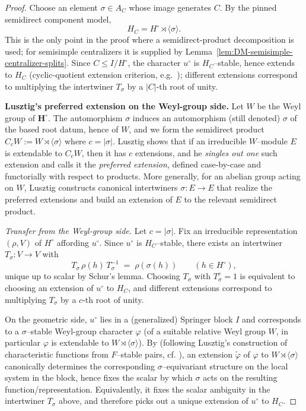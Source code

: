 \documentclass{amsart}
\theoremstyle{plain}
\numberwithin{equation}{section}
\theoremstyle{definition}
\begin{document}
\begin{proof}
Choose an element $\sigma\in A_C$ whose image generates $C$.  By the pinned
semidirect component model,
\[
        H_C=H^\circ\rtimes\langle\sigma\rangle .
\]
This is the only point in the proof where a semidirect-product decomposition is
used; for semisimple centralizers it is supplied by
Lemma~\ref{lem:DM-semisimple-centralizer-splits}.  Since $C\le I/H^\circ$, the
character $u^\circ$ is $H_C$--stable, hence extends to $H_C$ (cyclic-quotient
extension criterion, e.g.\ \cite[Cor.\ 11.22]{Isaacs}); different extensions correspond to multiplying the
intertwiner $T_\sigma$ by a $|C|$-th root of unity.

\textbf{Lusztig's preferred extension on the Weyl-group side.}
Let $W$ be the Weyl group of $\mathbf H^\circ$.
The automorphism $\sigma$ induces an automorphism (still denoted) $\sigma$ of the based root datum,
hence of $W$, and we form the semidirect product $C_cW:=W\rtimes\langle\sigma\rangle$ where
$c=|\sigma|$.
Lusztig shows that if an irreducible $W$--module $E$ is extendable to $C_cW$, then it has $c$
extensions, and he \emph{singles out one} such extension and calls it the \emph{preferred extension},
defined case-by-case and functorially with respect to products.  \cite[\S17.2]{Lusztig1986character}
More generally, for an abelian group acting on $W$, Lusztig constructs canonical intertwiners
$\sigma:E\to E$ that realize the preferred extensions and build an extension of $E$ to the relevant
semidirect product. \cite[\S17.3]{Lusztig1986character}

\smallskip\noindent
\emph{Transfer from the Weyl-group side.}
Let $c=|\sigma|$.
Fix an irreducible representation $(\rho,V)$ of $H^\circ$ affording $u^\circ$.
Since $u^\circ$ is $H_C$--stable, there exists an intertwiner
$T_\sigma:V\to V$ with
\[
T_\sigma\,\rho(h)\,T_\sigma^{-1} \;=\; \rho(\sigma(h))
\qquad(h\in H^\circ),
\]
unique up to scalar by Schur's lemma. Choosing $T_\sigma$ with $T_\sigma^c=1$
is equivalent to choosing an extension of $u^\circ$ to $H_C$, and different
extensions correspond to multiplying $T_\sigma$ by a $c$-th root of unity.

On the geometric side, $u^\circ$ lies in a (generalized) Springer block $I$
and corresponds to a $\sigma$--stable Weyl-group character $\varphi$
(of a suitable relative Weyl group $W$, in particular $\varphi$ is extendable
to $W\rtimes\langle\sigma\rangle$).  By \cite[\S2]{DLM03} (following Lusztig's
construction of characteristic functions from $F$--stable pairs, cf.
\cite[24.1--24.2]{Lus84}), an extension $\tilde\varphi$ of $\varphi$ to
$W\rtimes\langle\sigma\rangle$ canonically determines the corresponding
$\sigma$--equivariant structure on the local system in the block, hence fixes
the scalar by which $\sigma$ acts on the resulting function/representation.
Equivalently, it fixes the scalar ambiguity in the intertwiner $T_\sigma$
above, and therefore picks out a unique extension of $u^\circ$ to $H_C$.


\end{proof}
\end{document}
